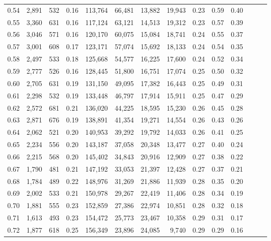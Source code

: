 \begin{tabular}{rrrrrrrrrrrrrr}
0.54 &  2,891 &  532 &  0.16 &  113,764 &   66,481 &  13,882 &  19,943 &  0.23 &  0.59 &      0.40 \\
0.55 &  3,360 &  631 &  0.16 &  117,124 &   63,121 &  14,513 &  19,312 &  0.23 &  0.57 &      0.39 \\
0.56 &  3,046 &  571 &  0.16 &  120,170 &   60,075 &  15,084 &  18,741 &  0.24 &  0.55 &      0.37 \\
0.57 &  3,001 &  608 &  0.17 &  123,171 &   57,074 &  15,692 &  18,133 &  0.24 &  0.54 &      0.35 \\
0.58 &  2,497 &  533 &  0.18 &  125,668 &   54,577 &  16,225 &  17,600 &  0.24 &  0.52 &      0.34 \\
0.59 &  2,777 &  526 &  0.16 &  128,445 &   51,800 &  16,751 &  17,074 &  0.25 &  0.50 &      0.32 \\
0.60 &  2,705 &  631 &  0.19 &  131,150 &   49,095 &  17,382 &  16,443 &  0.25 &  0.49 &      0.31 \\
0.61 &  2,298 &  532 &  0.19 &  133,448 &   46,797 &  17,914 &  15,911 &  0.25 &  0.47 &      0.29 \\
0.62 &  2,572 &  681 &  0.21 &  136,020 &   44,225 &  18,595 &  15,230 &  0.26 &  0.45 &      0.28 \\
0.63 &  2,871 &  676 &  0.19 &  138,891 &   41,354 &  19,271 &  14,554 &  0.26 &  0.43 &      0.26 \\
0.64 &  2,062 &  521 &  0.20 &  140,953 &   39,292 &  19,792 &  14,033 &  0.26 &  0.41 &      0.25 \\
0.65 &  2,234 &  556 &  0.20 &  143,187 &   37,058 &  20,348 &  13,477 &  0.27 &  0.40 &      0.24 \\
0.66 &  2,215 &  568 &  0.20 &  145,402 &   34,843 &  20,916 &  12,909 &  0.27 &  0.38 &      0.22 \\
0.67 &  1,790 &  481 &  0.21 &  147,192 &   33,053 &  21,397 &  12,428 &  0.27 &  0.37 &      0.21 \\
0.68 &  1,784 &  489 &  0.22 &  148,976 &   31,269 &  21,886 &  11,939 &  0.28 &  0.35 &      0.20 \\
0.69 &  2,002 &  533 &  0.21 &  150,978 &   29,267 &  22,419 &  11,406 &  0.28 &  0.34 &      0.19 \\
0.70 &  1,881 &  555 &  0.23 &  152,859 &   27,386 &  22,974 &  10,851 &  0.28 &  0.32 &      0.18 \\
0.71 &  1,613 &  493 &  0.23 &  154,472 &   25,773 &  23,467 &  10,358 &  0.29 &  0.31 &      0.17 \\
0.72 &  1,877 &  618 &  0.25 &  156,349 &   23,896 &  24,085 &   9,740 &  0.29 &  0.29 &      0.16 \\

\end{tabular}
